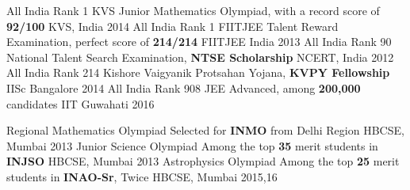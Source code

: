 \begin{cvhonors}
  \cvhonor
    {All India Rank 1}
    {KVS Junior Mathematics Olympiad, with a record score of \textbf{92/100}}
    {KVS, India}
    {2014}
  \cvhonor
    {All India Rank 1}
    {FIITJEE Talent Reward Examination, perfect score of \textbf{214/214}}
    {FIITJEE India}
    {2013}
  \cvhonor
    {All India Rank 90}
    {National Talent Search Examination, \textbf{NTSE Scholarship}}
    {NCERT, India}
    {2012}
  \cvhonor
    {All India Rank 214}
    {Kishore Vaigyanik Protsahan Yojana, \textbf{KVPY Fellowship}}
    {IISc Bangalore}
    {2014}
  \cvhonor
    {All India Rank 908}
    {JEE Advanced, among \textbf{200,000} candidates}
    {IIT Guwahati}
    {2016}
\end{cvhonors}

\begin{cvhonors}
  \cvhonor
    {Regional Mathematics Olympiad}
    {Selected for \textbf{INMO} from Delhi Region}
    {HBCSE, Mumbai}
    {2013}
  \cvhonor
    {Junior Science Olympiad}
    {Among the top \textbf{35} merit students in \textbf{INJSO} }
    {HBCSE, Mumbai}
    {2013}
  \cvhonor
    {Astrophysics Olympiad}
    {Among the top \textbf{25} merit students in \textbf{INAO-Sr}, Twice}
    {HBCSE, Mumbai}
    {2015,16}
\end{cvhonors}
